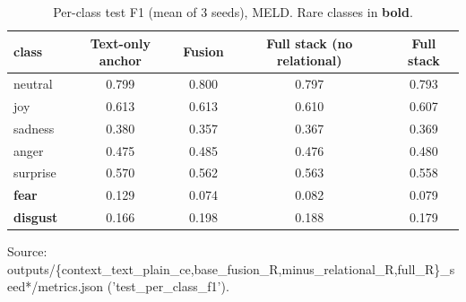 \begin{table}[t]
\centering
\caption{Per-class test F1 (mean of 3 seeds), MELD. Rare classes in \textbf{bold}.}
\label{tab:per-class-meld}
\begin{tabular}{lcccc}
\toprule
class & Text-only anchor & Fusion & Full stack (no relational) & Full stack \\
\midrule
neutral & 0.799 & 0.800 & 0.797 & 0.793 \\
joy & 0.613 & 0.613 & 0.610 & 0.607 \\
sadness & 0.380 & 0.357 & 0.367 & 0.369 \\
anger & 0.475 & 0.485 & 0.476 & 0.480 \\
surprise & 0.570 & 0.562 & 0.563 & 0.558 \\
\textbf{fear} & 0.129 & 0.074 & 0.082 & 0.079 \\
\textbf{disgust} & 0.166 & 0.198 & 0.188 & 0.179 \\
\bottomrule
\end{tabular}
\par\footnotesize Source: outputs/\{context\_text\_plain\_ce,base\_fusion\_R,minus\_relational\_R,full\_R\}\_seed*/metrics.json ('test\_per\_class\_f1').
\end{table}
